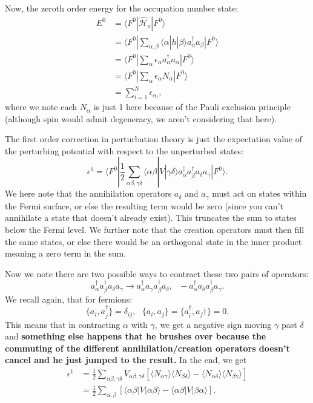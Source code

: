 \documentclass[fontsize=12pt]{scrartcl}
\newcommand{\la}{\langle}
\newcommand{\ra}{\rangle}
\newcommand{\Ham}{\hat{\mathcal{H}}}
\begin{document}
Now, the zeroth order energy for the occupation number state: \begin{align*}
E^0 &= \la F^0|\Ham_o|F^0\ra \\ &= \la F^0| \sum_{\alpha,\beta} \la \alpha|h|\beta\ra a^\dagger_{\alpha}a_\beta |F^0\ra\\
&= \la F^0|\sum_\alpha \epsilon_{\alpha} a^\dagger_{\alpha}a_\alpha |F^0\ra\\
&= \la F^0 | \sum_{\alpha}\epsilon_\alpha N_\alpha |F^0\ra\\
&= \sum_{i=1}^{N} \epsilon_{\alpha_i},
\end{align*} where we note each $N_\alpha$ is just 1 here because of the Pauli exclusion principle (although spin would admit degeneracy, we aren't considering that here).

The first order correction in perturbation theory is just the expectation value of the perturbing potential with respect to the unperturbed states: $$\epsilon^1 = \la F^0|\frac{1}{2} \sum_{\alpha\beta,\gamma\delta} \la \alpha\beta|V|\gamma\delta\ra a^\dagger_\alpha a^\dagger_\beta a_\delta a_\gamma|F^0\ra.$$ We here note that the annihilation operators $a_\delta$ and $a_\gamma$ must act on states within the Fermi surface, or else the resulting term would be zero (since you can't annihilate a state that doesn't already exist). This truncates the sum to states below the Fermi level. We further note that the creation operators must then fill the same states, or else there would be an orthogonal state in the inner product meaning a zero term in the sum.

Now we note there are two possible ways to contract these two pairs of operators: $$a^\dagger_\alpha a^\dagger_\beta a_\delta a_\gamma \to a^\dagger_\alpha a_\gamma a^\dagger_\beta a_\delta, \ \ \ -a^\dagger_\alpha a_\delta a^\dagger_\beta a_\gamma.$$ We recall again, that for fermions: $$\{a_i, a_j^\dagger\} = \delta_{ij}, \ \ \ \{a_i,a_j\}=\{a_i^\dagger, a_j\dagger\} = 0.$$ This means that in contracting $\alpha$ with $\gamma$, we get a negative sign moving $\gamma$ past $\delta$ and \textbf{something else happens that he brushes over because the commuting of the different annihilation/creation operators doesn't cancel and he just jumped to the result.} In the end, we get \begin{align*}
\epsilon^1 &= \frac{1}{2}\sum_{\alpha\beta,\gamma\delta} V_{\alpha\beta,\gamma\delta}\left[\la N_{\alpha \gamma}\ra \la N_{\beta\delta}\ra - \la N_{\alpha\delta}\ra \la N_{\beta\gamma}\ra\right]\\
&= \frac{1}{2}\sum_{\alpha,\beta} \left[\la \alpha\beta | V | \alpha\beta\ra - \la \alpha\beta|V|\beta\alpha\ra\right].
\end{align*}
\end{document}
